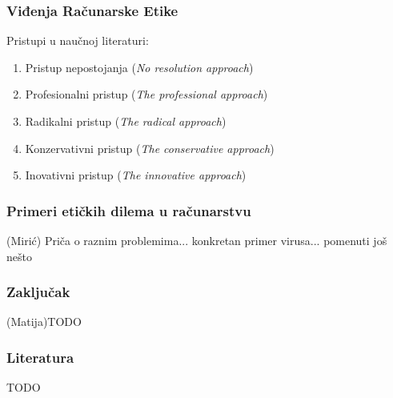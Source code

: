 \documentclass[pdf]{beamer}
\begin{document}
\begin{frame}
\frametitle{Viđenja Računarske Etike}

	Pristupi u naučnoj literaturi:
	\begin{enumerate}
	\item Pristup nepostojanja (\textit{No resolution approach})
	\item Profesionalni pristup (\textit{The professional approach})
	\item Radikalni pristup (\textit{The radical approach})
	\item Konzervativni pristup (\textit{The conservative approach})
	\item Inovativni pristup (\textit{The innovative approach})
	\end{enumerate}
	\end{frame}


\begin{frame}
\frametitle{Primeri etičkih dilema u računarstvu}
	(Mirić)
	Priča o raznim problemima... konkretan primer virusa... pomenuti još nešto
	\end{frame}


\begin{frame}
\frametitle{Zaključak}
	(Matija)TODO
	\end{frame}


\begin{frame}
\frametitle{Literatura}
	TODO
	\end{frame}
\end{document}
